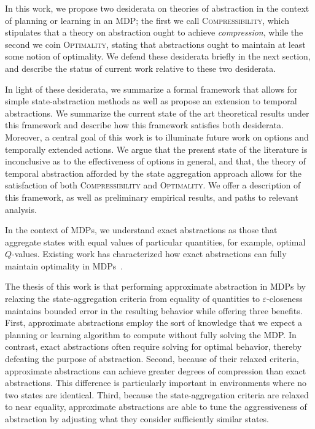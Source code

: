 
In this work, we propose two desiderata on theories of abstraction in the context of planning or learning in an \ac{MDP}; the first we call \textsc{Compressibility}, which stipulates that a theory on abstraction ought to achieve {\it compression}, while the second we coin \textsc{Optimality}, stating that abstractions ought to maintain at least some notion of optimality. We defend these desiderata briefly in the next section, and describe the status of current work relative to these two desiderata. 

In light of these desiderata, we summarize a formal framework that allows for simple state-abstraction methods as well as propose an extension to temporal abstractions.  We summarize the current state of the art theoretical results under this framework and describe how this framework satisfies both desiderata. Moreover, a central goal of this work is to illuminate future work on options and temporally extended actions. We argue that the present state of the literature is inconclusive as to the effectiveness of options in general, and that, the theory of temporal abstraction afforded by the state aggregation approach allows for the satisfaction of both \textsc{Compressibility} and \textsc{Optimality}. We offer a description of this framework, as well as preliminary empirical results, and paths to relevant analysis.

%



In the context of \acp{MDP}, we understand exact abstractions as those that aggregate states with equal values of particular quantities, for example, optimal $Q$-values. Existing work has characterized how exact abstractions can fully maintain optimality in \acp{MDP}~\cite{li2006towards,dean1997modelmin}. 



The thesis of this work is that performing approximate abstraction in \acp{MDP} by relaxing the state-aggregation criteria from equality of quantities to $\varepsilon$-closeness maintains bounded error in the resulting behavior while offering three benefits. First, approximate abstractions employ the sort of knowledge that we expect a planning or learning algorithm to compute without fully solving the \ac{MDP}. In contrast, exact abstractions often require solving for optimal behavior, thereby defeating the purpose of abstraction. Second, because of their relaxed criteria, approximate abstractions can achieve greater degrees of compression than exact abstractions. This difference is particularly important in environments where no two states are identical. Third, because the state-aggregation criteria are relaxed to near equality, approximate abstractions are able to tune the aggressiveness of abstraction by adjusting what they consider sufficiently similar states. 

